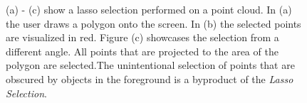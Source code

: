 \begin{figure}
\centering
{}\par\medskip
{}\par\medskip        
{}
\caption{(a) - (c) show a lasso selection performed on a point cloud. In (a) the user draws a polygon onto the screen. In (b) the selected points are visualized in red. Figure (c) showcases the selection from a different angle. All points that are projected to the area of the polygon are selected.The unintentional selection of points that are obscured by objects in the foreground is a byproduct of the \textit{Lasso Selection}. }
\label{fig:lasso}
\end{figure}


